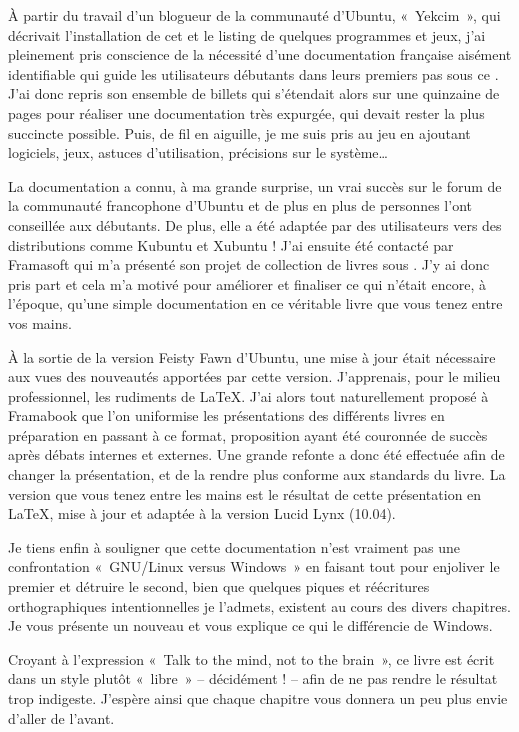 À partir du travail d'un blogueur de la communauté d'Ubuntu, «~Yekcim~», qui décrivait l'installation de cet  et le listing de quelques programmes et jeux, j'ai pleinement pris conscience de la nécessité d'une documentation française aisément identifiable qui guide les utilisateurs débutants dans leurs premiers pas sous ce . J'ai donc repris son ensemble de billets qui s'étendait alors sur une quinzaine de pages pour réaliser une documentation très expurgée, qui devait rester la plus succincte possible. Puis, de fil en aiguille, je me suis pris au jeu en ajoutant logiciels, jeux, astuces d'utilisation, précisions sur le système\ldots{}\par
La documentation a connu, à ma grande surprise, un vrai succès sur le forum de la communauté francophone d'Ubuntu et de plus en plus de personnes l'ont conseillée aux débutants. De plus, elle a été adaptée par des utilisateurs vers des distributions comme Kubuntu et Xubuntu ! J'ai ensuite été contacté par Framasoft qui m'a présenté son projet de collection de livres sous . J'y ai donc pris part et cela m'a motivé pour améliorer et finaliser ce qui n'était encore, à l'époque, qu'une simple documentation en ce véritable livre que vous tenez entre vos mains.\par
À la sortie de la version Feisty Fawn d'Ubuntu, une mise à jour était nécessaire aux vues des nouveautés apportées par cette version. J'apprenais, pour le milieu professionnel, les rudiments de \LaTeX{}. J'ai alors tout naturellement proposé à Framabook que l'on uniformise les présentations des différents livres en préparation en passant à ce format, proposition ayant été couronnée de succès après débats internes et externes. Une grande refonte a donc été effectuée afin de changer la présentation, et de la rendre plus conforme aux standards du livre. La version que vous tenez entre les mains est le résultat de cette présentation en \LaTeX{}, mise à jour et adaptée à la version Lucid Lynx (10.04).\par
Je tiens enfin à souligner que cette documentation n'est vraiment pas une confrontation «~GNU/Linux versus Windows~» en faisant tout pour enjoliver le premier et détruire le second, bien que quelques piques et réécritures orthographiques intentionnelles je l'admets, existent au cours des divers chapitres. Je vous présente un nouveau  et vous explique ce qui le différencie de Windows.\par
Croyant à l'expression «~Talk to the mind, not to the brain~», ce livre est écrit dans un style plutôt «~libre~» -- décidément ! -- afin de ne pas rendre le résultat trop indigeste. J'espère ainsi que chaque chapitre vous donnera un peu plus envie d'aller de l'avant.\par
